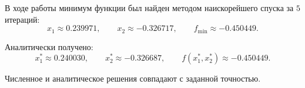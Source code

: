 В ходе работы минимум функции был найден методом наискорейшего спуска за \(5\) итераций:
\[
x_1 \approx 0.239971,\qquad x_2 \approx -0.326717,
\qquad f_{\min}\approx -0.450449.
\]

Аналитически получено:
\[
x_1^* \approx 0.240030,\qquad x_2^* \approx -0.326687,
\qquad f(x_1^*,x_2^*)\approx -0.450449.
\]

Численное и аналитическое решения совпадают с заданной точностью.